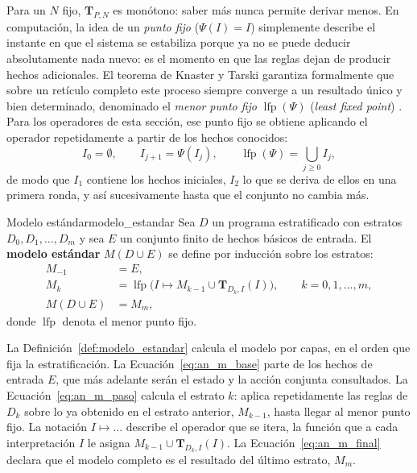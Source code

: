 Para un $N$ fijo, $\mathbf T_{P,N}$ es monótono: saber más nunca permite derivar menos. En computación, la idea de un \emph{punto fijo} ($\Psi(I) = I$) simplemente describe el instante en que el sistema se estabiliza porque ya no se puede deducir absolutamente nada nuevo: es el momento en que las reglas dejan de producir hechos adicionales. El teorema de Knaster y Tarski garantiza formalmente que sobre un retículo completo este proceso siempre converge a un resultado único y bien determinado, denominado el \emph{menor punto fijo} $\operatorname{lfp}(\Psi)$ (\textit{least fixed point}) \cite{Lloyd1987}. Para los operadores de esta sección, ese punto fijo se obtiene aplicando el operador repetidamente a partir de los hechos conocidos:
\begin{equation}
    I_0 = \emptyset, \qquad I_{j+1} = \Psi(I_j), \qquad \operatorname{lfp}(\Psi) = \bigcup_{j \ge 0} I_j ,
    \label{eq:an_iteracion_lfp}
\end{equation}
de modo que $I_1$ contiene los hechos iniciales, $I_2$ lo que se deriva de ellos en una primera ronda, y así sucesivamente hasta que el conjunto no cambia más.

\begin{definicion}{Modelo estándar}{modelo_estandar}
Sea $D$ un programa estratificado con estratos $D_0, D_1, \dots, D_m$ y sea $E$ un conjunto finito de hechos básicos de entrada. El \textbf{modelo estándar} $M(D \cup E)$ se define por inducción sobre los estratos:
\begin{align}
    M_{-1} &= E, \label{eq:an_m_base}\\
    M_k &= \operatorname{lfp}\big( I \mapsto M_{k-1} \cup \mathbf T_{D_k, I}(I) \big), \qquad k = 0, 1, \dots, m, \label{eq:an_m_paso}\\
    M(D \cup E) &= M_m , \label{eq:an_m_final}
\end{align}
donde $\operatorname{lfp}$ denota el menor punto fijo.
\end{definicion}

La Definición~\ref{def:modelo_estandar} calcula el modelo por capas, en el orden que fija la estratificación. La Ecuación~\eqref{eq:an_m_base} parte de los hechos de entrada $E$, que más adelante serán el estado y la acción conjunta consultados. La Ecuación~\eqref{eq:an_m_paso} calcula el estrato $k$: aplica repetidamente las reglas de $D_k$ sobre lo ya obtenido en el estrato anterior, $M_{k-1}$, hasta llegar al menor punto fijo. La notación $I \mapsto \ldots$ describe el operador que se itera, la función que a cada interpretación $I$ le asigna $M_{k-1} \cup \mathbf T_{D_k, I}(I)$. La Ecuación~\eqref{eq:an_m_final} declara que el modelo completo es el resultado del último estrato, $M_m$.

